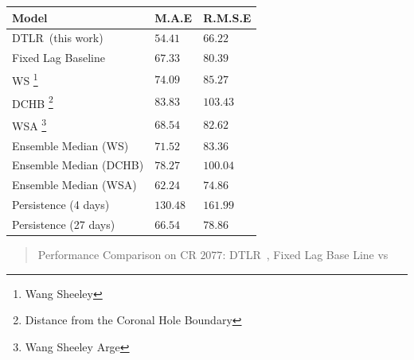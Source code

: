 \documentclass[portrait,a0,final]{a0poster}
\newcommand{\mytablecaption}[1]{
  \vspace{0.5cm}
  \begin{center}
    \begin{quote}
        {#1}
    \end{quote}    
  \end{center}
  \vspace{1cm}
  \stepcounter{table}
}
\def\XX{{DTLR}}
\newenvironment{poster}{
  \begin{center}
  \begin{minipage}[c]{0.95\textwidth}
}{
  \end{minipage} 
  \end{center}
}
\begin{document}
\begin{poster}
\begin{multicols}{2}
\vspace{\baselineskip}

\begin{center}
  \label{tab:results_reiss}
  \centering
  \begin{tabular}{ l l l }
  \hline
  Model &  M.A.E & R.M.S.E \\
  \hline
  \XX \ (this work) & $54.41$ & $66.22$ \\
  Fixed Lag Baseline & $67.33$ & $80.39$ \\
  WS \footnote{Wang Sheeley} & $74.09$ & $85.27$ \\
  DCHB \footnote{Distance from the Coronal Hole Boundary} & $83.83$ & $103.43$ \\
  WSA \footnote{Wang Sheeley Arge} & $68.54$ & $82.62$ \\
  Ensemble Median (WS)   & $71.52$ & $83.36$ \\
  Ensemble Median (DCHB) & $78.27$ & $100.04$ \\
  Ensemble Median (WSA)  & $62.24$ & $74.86$ \\
  Persistence (4 days)   & $130.48$ & $161.99$ \\
  Persistence (27 days)  & $66.54$ & $78.86$ \\
  \hline
  \end{tabular}
  \mytablecaption{
    Performance Comparison on CR $2077$: \XX \ , 
    Fixed Lag Base Line vs \citet{Reiss_2019}
  }
\end{center}






\end{multicols}

\end{poster}
\end{document}
